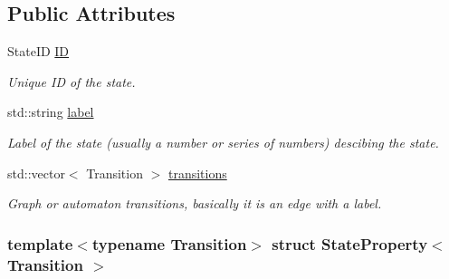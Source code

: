 \subsection*{\-Public \-Attributes}
\begin{DoxyCompactItemize}
\item 
\hypertarget{structStateProperty_af33be20c9033f9b6524c0447e7ac647e}{\-State\-I\-D \hyperlink{structStateProperty_af33be20c9033f9b6524c0447e7ac647e}{\-I\-D}}\label{structStateProperty_af33be20c9033f9b6524c0447e7ac647e}

\begin{DoxyCompactList}\small\item\em \-Unique \-I\-D of the state. \end{DoxyCompactList}\item 
\hypertarget{structStateProperty_a7cfb634f80b68196eefa54e8ee98a5fe}{std\-::string \hyperlink{structStateProperty_a7cfb634f80b68196eefa54e8ee98a5fe}{label}}\label{structStateProperty_a7cfb634f80b68196eefa54e8ee98a5fe}

\begin{DoxyCompactList}\small\item\em \-Label of the state (usually a number or series of numbers) descibing the state. \end{DoxyCompactList}\item 
\hypertarget{structStateProperty_a1bbac90e1ce9ff4f54749eaeff3847cb}{std\-::vector$<$ \-Transition $>$ \hyperlink{structStateProperty_a1bbac90e1ce9ff4f54749eaeff3847cb}{transitions}}\label{structStateProperty_a1bbac90e1ce9ff4f54749eaeff3847cb}

\begin{DoxyCompactList}\small\item\em \-Graph or automaton transitions, basically it is an edge with a label. \end{DoxyCompactList}\end{DoxyCompactItemize}
\subsubsection*{template$<$typename \-Transition$>$ struct State\-Property$<$ Transition $>$}




